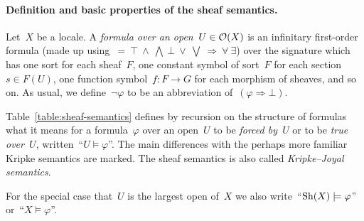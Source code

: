 \documentclass{ws-rv9x6}
\begin{document}
{\paragraph{Definition and basic properties of the sheaf semantics.}
Let~$X$ be a locale. A \emph{formula over an open~$U \in \mathcal{O}(X)$} is an
infinitary first-order formula (made up using~${=}\ {\top}\ {\wedge}\ {\bigwedge}\ {\bot}\ {\vee}\
{\bigvee}\ {\Rightarrow}\ {\forall}\ {\exists}$) over the signature which has one sort for
each sheaf~$F$, one constant symbol of sort~$F$ for each section~$s \in F(U)$,
one function symbol~$f : F \to G$ for each morphism of sheaves, and so on. As
usual, we define~$\neg\varphi$ to be an abbreviation of~$(\varphi \Rightarrow
\bot)$.

Table~\ref{table:sheaf-semantics} defines by recursion on the structure of
formulas what it means for a formula~$\varphi$ over an open~$U$ to be
\emph{forced by~$U$} or to be \emph{true over~$U$}, written~``$U \models \varphi$''. The
main differences with the perhaps more familiar Kripke semantics are marked.
The sheaf semantics is also called \emph{Kripke--Joyal semantics}.

For the special case that~$U$ is the largest open of~$X$ we also write~``$\mathrm{Sh}(X)
\models \varphi$'' or~``$X \models \varphi$''.

}
\end{document}
